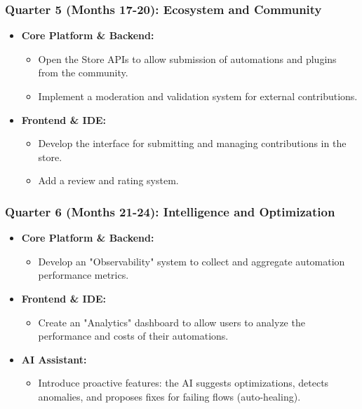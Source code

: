 \documentclass[11pt, a4paper, oneside]{article}
\begin{document}
\subsubsection*{Quarter 5 (Months 17-20): Ecosystem and Community}
\begin{itemize}[leftmargin=*]
    \item \textbf{Core Platform \& Backend:}
    \begin{itemize}
        \item Open the Store APIs to allow submission of automations and plugins from the community.
        \item Implement a moderation and validation system for external contributions.
    \end{itemize}
    \item \textbf{Frontend \& IDE:}
    \begin{itemize}
        \item Develop the interface for submitting and managing contributions in the store.
        \item Add a review and rating system.
    \end{itemize}
\end{itemize}

\subsubsection*{Quarter 6 (Months 21-24): Intelligence and Optimization}
\begin{itemize}[leftmargin=*]
    \item \textbf{Core Platform \& Backend:}
    \begin{itemize}
        \item Develop an "Observability" system to collect and aggregate automation performance metrics.
    \end{itemize}
    \item \textbf{Frontend \& IDE:}
    \begin{itemize}
        \item Create an "Analytics" dashboard to allow users to analyze the performance and costs of their automations.
    \end{itemize}
    \item \textbf{AI Assistant:}
    \begin{itemize}
        \item Introduce proactive features: the AI suggests optimizations, detects anomalies, and proposes fixes for failing flows (auto-healing).
    \end{itemize}
\end{itemize}
\end{document}
